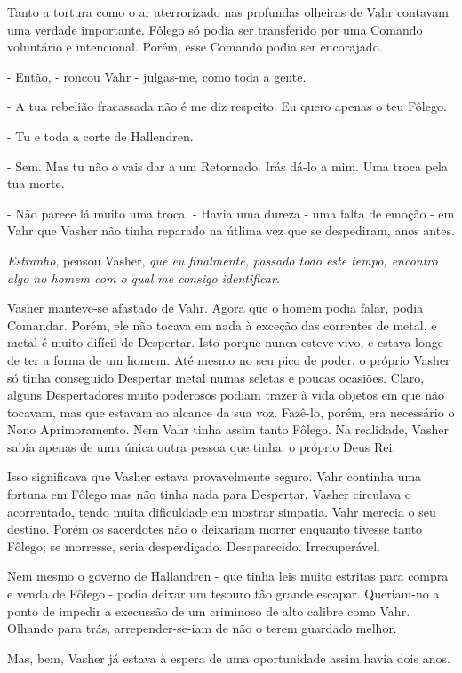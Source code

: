 \documentclass[11pt,a4paper]{book}
\begin{document}
 Tanto a tortura como o ar aterrorizado nas profundas olheiras de Vahr contavam uma verdade importante. Fôlego só podia ser transferido por uma Comando voluntário e intencional. Porém, esse Comando podia ser encorajado.
 
 - Então, - roncou Vahr - julgas-me, como toda a gente.
 
 - A tua rebelião fracassada não é me diz respeito. Eu quero apenas o teu Fôlego.
 
 - Tu e toda a corte de Hallendren.
 
 - Sem. Mas tu não o vais dar a um Retornado. Irás dá-lo a mim. Uma troca pela tua morte.
 
 - Não parece lá muito uma troca. - Havia uma dureza - uma falta de emoção - em Vahr que Vasher não tinha reparado na útlima vez que se despediram, anos antes. 
 
 \textit{Estranho}, pensou Vasher, \textit{que eu finalmente, passado todo este tempo, encontro algo no homem com o qual me consigo identificar}.
 
 Vasher manteve-se afastado de Vahr. Agora que o homem podia falar, podia Comandar. Porém, ele não tocava em nada à exceção das correntes de metal, e metal é muito difícil de Despertar. Isto porque nunca esteve vivo, e estava longe de ter a forma de um homem. Até mesmo no seu pico de poder, o próprio Vasher só tinha conseguido Despertar metal numas seletas e poucas ocasiões. Claro, alguns Despertadores muito poderosos podiam trazer à vida objetos em que não tocavam, mas que estavam ao alcance da sua voz. Fazê-lo, porém, era necessário o Nono Aprimoramento. Nem Vahr tinha assim tanto Fôlego. Na realidade, Vasher sabia apenas de uma única outra pessoa que tinha: o próprio Deus Rei.
 
 Isso significava que Vasher estava provavelmente seguro. Vahr continha uma fortuna em Fôlego mas não tinha nada para Despertar. Vasher circulava o acorrentado, tendo muita dificuldade em mostrar simpatia. Vahr merecia o seu destino. Porém os sacerdotes não o deixariam morrer enquanto tivesse tanto Fôlego; se morresse, seria desperdiçado. Desaparecido. Irrecuperável.
  
  Nem mesmo o governo de Hallandren - que tinha leis muito estritas para compra e venda de Fôlego - podia deixar um tesouro tão grande escapar. Queriam-no a ponto de impedir a execussão de um criminoso de alto calibre como Vahr. Olhando para trás, arrepender-se-iam de não o terem guardado melhor.
  
Mas, bem, Vasher já estava à espera de uma oportunidade assim havia dois anos.
\end{document}
